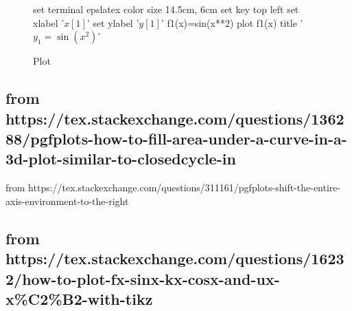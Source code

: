 \documentclass{article}
\begin{document}
\begin{figure}[h]  \centering
\begin{gnuplot}[terminal=epslatex]
	set terminal epslatex color size 14.5cm, 6cm
	set key top left
	set xlabel '$ x [1] $'
	set ylabel '$ y [1] $'
	f1(x)=sin(x**2)
	plot f1(x) title '$ y_1 = \sin(x^2) $'
\end{gnuplot}
\caption{Plot}
\end{figure}




\subsection{from https://tex.stackexchange.com/questions/136288/pgfplots-how-to-fill-area-under-a-curve-in-a-3d-plot-similar-to-closedcycle-in}





from https://tex.stackexchange.com/questions/311161/pgfplots-shift-the-entire-axis-environment-to-the-right





\subsection{from https://tex.stackexchange.com/questions/16232/how-to-plot-fx-sinx-kx-cosx-and-ux-x\%C2\%B2-with-tikz}
\end{document}
